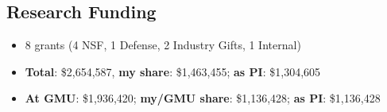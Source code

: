 \documentclass[11pt]{article}
\begin{document}
\subsection{Research Funding}
\begin{itemize}[label={},before=\small]
\item 8 grants (4 NSF, 1 Defense, 2 Industry Gifts, 1 Internal)

\item \textbf{Total}: \$2,654,587, \textbf{my share}: \$1,463,455;  \textbf{as PI}: \$1,304,605
\item \textbf{At GMU}: \$1,936,420; \textbf{my/GMU share}: \$1,136,428; \textbf{as PI}: \$1,136,428
\end{itemize}


\end{document}
